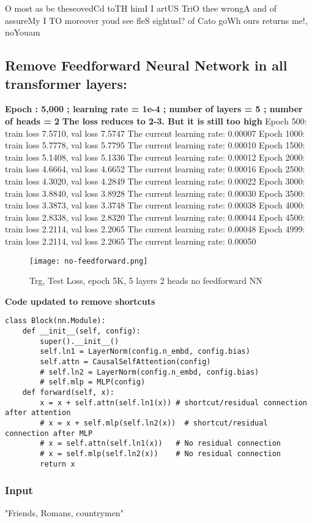 \documentclass[conference]{IEEEtran}
\begin{document}
O most as
 be theseovedCd toTH himI I artUS TriO thee wrongA and of assureMy I TO moreover youd see fleS sightusl? of Cato goWh ours returns me!, noYouam

 \subsection{Remove Feedforward Neural Network in all transformer layers:}
 \textbf{Epoch : 5,000 ; learning rate = 1e-4 ; number of layers = 5 ; number of heads = 2}
 \textbf{The loss reduces to 2-3. But it is still too high}
 Epoch 500: train loss 7.5710, val loss 7.5747
The current learning rate: 0.00007
Epoch 1000: train loss 5.7778, val loss 5.7795
The current learning rate: 0.00010
Epoch 1500: train loss 5.1408, val loss 5.1336
The current learning rate: 0.00012
Epoch 2000: train loss 4.6664, val loss 4.6652
The current learning rate: 0.00016
Epoch 2500: train loss 4.3020, val loss 4.2849
The current learning rate: 0.00022
Epoch 3000: train loss 3.8840, val loss 3.8928
The current learning rate: 0.00030
Epoch 3500: train loss 3.3873, val loss 3.3748
The current learning rate: 0.00038
Epoch 4000: train loss 2.8338, val loss 2.8320
The current learning rate: 0.00044
Epoch 4500: train loss 2.2114, val loss 2.2065
The current learning rate: 0.00048
Epoch 4999: train loss 2.2114, val loss 2.2065
The current learning rate: 0.00050
\begin{figure}[H]
    \centering
    \texttt{[image: no-feedforward.png]}
    \caption{Trg, Test Loss, epoch 5K, 5 layers 2 heads no feedforward NN}
    \label{fig:epoch}
\end{figure}
\textbf{Code updated to remove shortcuts}
\begin{verbatim}
class Block(nn.Module):
    def __init__(self, config):
        super().__init__()
        self.ln1 = LayerNorm(config.n_embd, config.bias)
        self.attn = CausalSelfAttention(config)
        # self.ln2 = LayerNorm(config.n_embd, config.bias)
        # self.mlp = MLP(config)
    def forward(self, x):
        x = x + self.attn(self.ln1(x)) # shortcut/residual connection after attention
        # x = x + self.mlp(self.ln2(x))  # shortcut/residual connection after MLP
        # x = self.attn(self.ln1(x))   # No residual connection
        # x = self.mlp(self.ln2(x))    # No residual connection
        return x
\end{verbatim}

\subsubsection{Input}
"Friends, Romans, countrymen"
\end{document}
